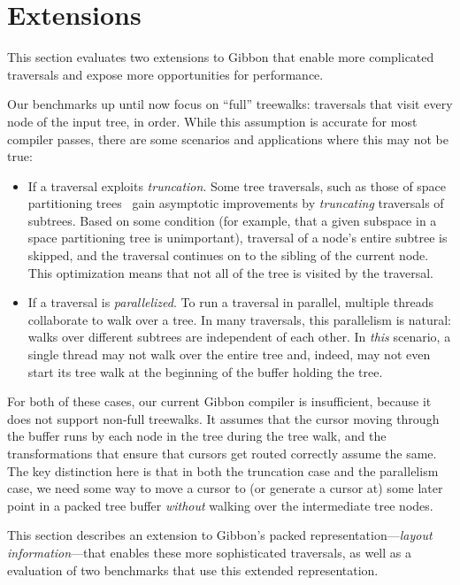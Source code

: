 \documentclass[a4paper,english]{lipics-v2016}
\newcommand{\treelang}{Gibbon\xspace} %
\begin{document}
\section{Extensions}
\label{sec:extensions}

This section evaluates two extensions to \treelang{} that enable more complicated traversals and expose more opportunities for performance.

Our benchmarks up until now focus on ``full'' treewalks: traversals that visit
every node of the input tree, in order. While this assumption is accurate for
most compiler passes, there are some scenarios and applications where this may
not be true:
\begin{itemize}
  \item If a traversal exploits {\em truncation}. Some tree traversals, such as those of space partitioning trees~\cite{gray2000n} gain asymptotic improvements by {\em truncating} traversals of subtrees. Based on some condition (for example, that a given subspace in a space partitioning tree is unimportant), traversal of a node's entire subtree is skipped, and the traversal continues on to the sibling of the current node. This optimization means that not all of the tree is visited by the traversal.
  \item If a traversal is {\em parallelized}. To run a traversal in parallel, multiple threads collaborate to walk over a tree. In many traversals, this parallelism is natural: walks over different subtrees are independent of each other. In {\em this} scenario, a single thread may not walk over the entire tree and, indeed, may not even start its tree walk at the beginning of the buffer holding the tree.
\end{itemize}

For both of these cases, our current \treelang{} compiler is insufficient,
because it does not support non-full treewalks. It assumes that the
cursor moving through the buffer runs by each node in the tree during the tree
walk, and the transformations that ensure that cursors get routed correctly
assume the same. The key distinction here is that in both the truncation case
and the parallelism case, we need some way to move a cursor to (or generate a
cursor at) some later point in a packed tree buffer {\em without} walking over
the intermediate tree nodes.

This section describes an extension to \treelang{}'s packed representation---{\em layout information}---that enables these more sophisticated traversals, as well as a evaluation of two benchmarks that use this extended representation.
\end{document}
